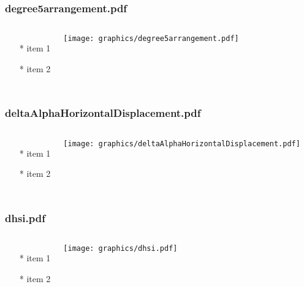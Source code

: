 \documentclass{beamer}
\begin{document}
\begin{frame} \frametitle{degree5arrangement.pdf}
    \begin{columns}[c]
        \begin{itemize}
            \item[*] item 1
            \item[*] item 2
        \end{itemize}
        \begin{minipage}{\linewidth}
            \begin{center}
            \texttt{[image: graphics/degree5arrangement.pdf]}
            \label{gfx:degree5arrangement.pdf}
            \end{center}
        \end{minipage}
    \end{columns}
\end{frame}
\begin{frame} \frametitle{deltaAlphaHorizontalDisplacement.pdf}
    \begin{columns}[c]
        \begin{itemize}
            \item[*] item 1
            \item[*] item 2
        \end{itemize}
        \begin{minipage}{\linewidth}
            \begin{center}
            \texttt{[image: graphics/deltaAlphaHorizontalDisplacement.pdf]}
            \label{gfx:deltaAlphaHorizontalDisplacement.pdf}
            \end{center}
        \end{minipage}
    \end{columns}
\end{frame}
\begin{frame} \frametitle{dhsi.pdf}
    \begin{columns}[c]
        \begin{itemize}
            \item[*] item 1
            \item[*] item 2
        \end{itemize}
        \begin{minipage}{\linewidth}
            \begin{center}
            \texttt{[image: graphics/dhsi.pdf]}
            \label{gfx:dhsi.pdf}
            \end{center}
        \end{minipage}
    \end{columns}
\end{frame}
\end{document}
